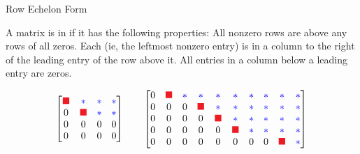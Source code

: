 \documentclass[xcolor=dvipsnames,aspectratio=169,t]{beamer}
\begin{document}
\begin{frame}{Row Echelon Form}

  \bbox
  A matrix is in  if it has the following properties:
  \bb
  \ii All nonzero rows are above any rows of all zeros.
  \ii Each  (ie, the leftmost nonzero entry) is in a column to the right of the leading entry of the row above it.
  \ii All entries in a column below a leading entry are zeros.
  \ee
  \ebox

  \renewcommand{\p}{\colorr{\blacksquare}}  %
  \newcommand{\n}{\colorb{*}}  %
  \[
    \begin{bmatrix}
      \p & \n & \n & \n \\
       0 & \p & \n & \n \\
       0 &  0 &  0 &  0 \\
       0 &  0 &  0 &  0
    \end{bmatrix}
    \qquad
    \begin{bmatrix}
      0 & \p & \n & \n & \n & \n & \n & \n & \n & \n \\
      0 &  0 &  0 & \p & \n & \n & \n & \n & \n & \n \\
      0 &  0 &  0 &  0 & \p & \n & \n & \n & \n & \n \\
      0 &  0 &  0 &  0 &  0 & \p & \n & \n & \n & \n \\
      0 &  0 &  0 &  0 &  0 &  0 &  0 &  0 & \p & \n
    \end{bmatrix}
  \]
  
\end{frame}
  
\end{document}
